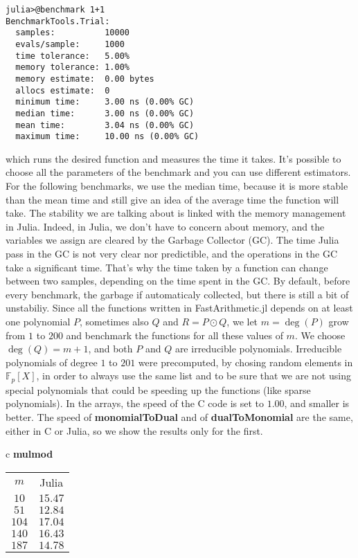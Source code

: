 \documentclass[a4paper,11pt]{article}
\theoremstyle{break}
\theoremstyle{definition}
\theoremstyle{remark}
\begin{document}
\begin{verbatim}
julia>@benchmark 1+1
BenchmarkTools.Trial: 
  samples:          10000
  evals/sample:     1000
  time tolerance:   5.00%
  memory tolerance: 1.00%
  memory estimate:  0.00 bytes
  allocs estimate:  0
  minimum time:     3.00 ns (0.00% GC)
  median time:      3.00 ns (0.00% GC)
  mean time:        3.04 ns (0.00% GC)
  maximum time:     10.00 ns (0.00% GC)
\end{verbatim}
which runs the desired function and measures the time it takes. It's possible
to choose all the parameters of the benchmark and you can use different
estimators. For the following benchmarks, we use the median time, because it
is more stable than the mean time and still give an idea of the average time
the function will take. The stability we are talking about is linked with the
memory management in Julia. Indeed, in Julia, we don't have to concern about
memory, and the variables we assign are cleared by the Garbage Collector
(GC). The time Julia pass in the GC is not very clear nor predictible, and the
operations in the GC take a significant time. That's why the time taken by a
function can change between two samples, depending on the time spent in the GC.
By default, before every benchmark, the garbage if automaticaly collected, but
there is still a bit of unstabiliy.
Since all the functions written in FastArithmetic.jl depends on at least one
polynomial $P$, sometimes also $Q$ and $R=P\odot Q$, we let $m=\deg (P)$ grow
from $1$ to $200$ and benchmark the functions for all these values of $m$. We
choose $\deg (Q)=m+1$, and both $P$ and $Q$ are irreducible polynomials.
Irreducible polynomials of degree $1$ to $201$ were precomputed, by chosing
random elements in $\mathbb{F}_{p}[X]$, in order to
always use the same list and to be sure that we are not using special
polynomials that could be speeding up the functions (like sparse
polynomials). In the arrays, the speed of
the C code is set to $1.00$, and smaller is better. The speed of 
\textbf{monomialToDual} and of \textbf{dualToMonomial} are the same, either in C
or Julia, so we show the results only for the first.

\begin{center}
  \begin{tabular}[here]{c}
    \textbf{mulmod} \\
    \begin{tabular}[here]{cc}
   $m$ & Julia \\
   $10$ & $15.47$\\
   $51$ & $12.84$\\
   $104$ & $17.04$\\
   $140$ & $16.43$\\
   $187$ & $14.78$\\
    \end{tabular}
  \end{tabular}
\end{center}
\end{document}
